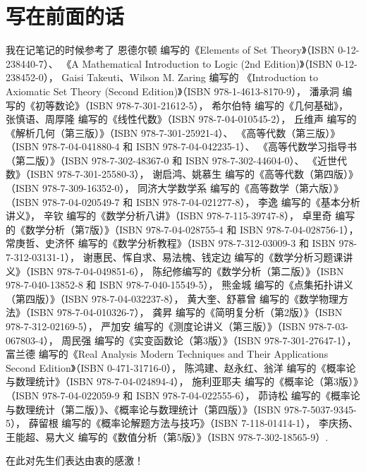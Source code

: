 \chapter*{写在前面的话}
我在记笔记的时候参考了
恩德尔顿 编写的《Elements of Set Theory》（ISBN 0-12-238440-7）、
《A Mathematical Introduction to Logic (2nd Edition)》（ISBN 0-12-238452-0），
Gaisi Takeuti、Wilson M. Zaring 编写的
《Introduction to Axiomatic Set Theory (Second Edition)》（ISBN 978-1-4613-8170-9），
潘承洞 编写的《初等数论》（ISBN 978-7-301-21612-5），
希尔伯特 编写的《几何基础》，
张慎语、周厚隆 编写的《线性代数》（ISBN 978-7-04-010545-2），
丘维声 编写的
《解析几何（第三版）》（ISBN 978-7-301-25921-4）、
《高等代数（第三版）》（ISBN 978-7-04-041880-4 和 ISBN 978-7-04-042235-1）、
《高等代数学习指导书（第二版）》（ISBN 978-7-302-48367-0 和 ISBN 978-7-302-44604-0）、
《近世代数》（ISBN 978-7-301-25580-3），
谢启鸿、姚慕生 编写的《高等代数（第四版）》（ISBN 978-7-309-16352-0），
同济大学数学系 编写的《高等数学（第六版）》（ISBN 978-7-04-020549-7 和 ISBN 978-7-04-021277-8），
李逸 编写的《基本分析讲义》，
辛钦 编写的《数学分析八讲》（ISBN 978-7-115-39747-8），
卓里奇 编写的《数学分析（第7版）》（ISBN 978-7-04-028755-4 和 ISBN 978-7-04-028756-1），
常庚哲、史济怀 编写的《数学分析教程》（ISBN 978-7-312-03009-3 和 ISBN 978-7-312-03131-1），
谢惠民、恽自求、易法槐、钱定边 编写的《数学分析习题课讲义》（ISBN 978-7-04-049851-6），
陈纪修编写的《数学分析（第二版）》（ISBN 978-7-040-13852-8 和 ISBN 978-7-040-15549-5），
熊金城 编写的《点集拓扑讲义（第四版）》（ISBN 978-7-04-032237-8），
黄大奎、舒慕曾 编写的《数学物理方法》（ISBN 978-7-04-010326-7），
龚昇 编写的《简明复分析（第2版）》（ISBN 978-7-312-02169-5），
严加安 编写的《测度论讲义（第三版）》（ISBN 978-7-03-067803-4），
周民强 编写的《实变函数论（第3版）》（ISBN 978-7-301-27647-1），
富兰德 编写的《Real Analysis Modern Techniques and Their Applications Second Edition》（ISBN 0-471-31716-0），
陈鸿建、赵永红、翁洋 编写的《概率论与数理统计》（ISBN 978-7-04-024894-4），
施利亚耶夫 编写的《概率论（第3版）》（ISBN 978-7-04-022059-9 和 ISBN 978-7-04-022555-6），
茆诗松 编写的《概率论与数理统计（第二版）》、《概率论与数理统计（第四版）》（ISBN 978-7-5037-9345-5），
薛留根 编写的《概率论解题方法与技巧》（ISBN 7-118-01414-1），
李庆扬、王能超、易大义 编写的《数值分析（第5版）》（ISBN 978-7-302-18565-9）.

在此对先生们表达由衷的感激！
